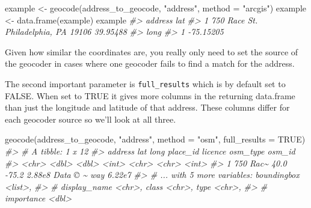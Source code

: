 \documentclass[
]{krantz}
\makeatletter
\newenvironment{Shaded}{\begin{snugshade}}{\end{snugshade}}
\newcommand{\AttributeTok}[1]{\textcolor[rgb]{0.61,0.61,0.61}{#1}}
\newcommand{\CommentTok}[1]{\textcolor[rgb]{0.37,0.37,0.37}{\textit{#1}}}
\newcommand{\ConstantTok}[1]{\textcolor[rgb]{0,0,0}{#1}}
\newcommand{\FunctionTok}[1]{\textcolor[rgb]{0,0,0}{#1}}
\newcommand{\NormalTok}[1]{#1}
\newcommand{\OtherTok}[1]{\textcolor[rgb]{0.37,0.37,0.37}{#1}}
\newcommand{\StringTok}[1]{\textcolor[rgb]{0.5,0.5,0.5}{#1}}
\newenvironment{kframe}{%
\medskip{}
\setlength{\fboxsep}{.8em}
 \def\at@end@of@kframe{}%
 \ifinner\ifhmode%
  \def\at@end@of@kframe{\end{minipage}}%
  \begin{minipage}{\columnwidth}%
 \fi\fi%
 \def\FrameCommand##1{\hskip\@totalleftmargin \hskip-\fboxsep
 \colorbox{shadecolor}{##1}\hskip-\fboxsep
     \hskip-\linewidth \hskip-\@totalleftmargin \hskip\columnwidth}%
 \MakeFramed {\advance\hsize-\width
   \@totalleftmargin\z@ \linewidth\hsize
   \@setminipage}}%
 {\par\unskip\endMakeFramed%
 \at@end@of@kframe}
\renewenvironment{Shaded}{\begin{kframe}}{\end{kframe}}
\makeatother
\begin{document}
\begin{Shaded}
\begin{Highlighting}[]
\NormalTok{example }\OtherTok{\textless{}{-}} \FunctionTok{geocode}\NormalTok{(address\_to\_geocode, }\StringTok{"address"}\NormalTok{, }\AttributeTok{method =} \StringTok{"arcgis"}\NormalTok{)}
\NormalTok{example }\OtherTok{\textless{}{-}} \FunctionTok{data.frame}\NormalTok{(example)}
\NormalTok{example}
\CommentTok{\#\textgreater{}                               address      lat}
\CommentTok{\#\textgreater{} 1 750 Race St. Philadelphia, PA 19106 39.95488}
\CommentTok{\#\textgreater{}        long}
\CommentTok{\#\textgreater{} 1 {-}75.15205}
\end{Highlighting}
\end{Shaded}

Given how similar the coordinates are, you really only need to set the source of the geocoder in cases where one geocoder fails to find a match for the address.

The second important parameter is \texttt{full\_results} which is by default set to FALSE. When set to TRUE it gives more columns in the returning data.frame than just the longitude and latitude of that address. These columns differ for each geocoder source so we'll look at all three.

\begin{Shaded}
\begin{Highlighting}[]
\FunctionTok{geocode}\NormalTok{(address\_to\_geocode, }\StringTok{"address"}\NormalTok{, }\AttributeTok{method =} \StringTok{"osm"}\NormalTok{, }\AttributeTok{full\_results =} \ConstantTok{TRUE}\NormalTok{)}
\CommentTok{\#\textgreater{} \# A tibble: 1 x 12}
\CommentTok{\#\textgreater{}   address    lat  long place\_id licence  osm\_type osm\_id}
\CommentTok{\#\textgreater{}   \textless{}chr\textgreater{}    \textless{}dbl\textgreater{} \textless{}dbl\textgreater{}    \textless{}int\textgreater{} \textless{}chr\textgreater{}    \textless{}chr\textgreater{}     \textless{}int\textgreater{}}
\CommentTok{\#\textgreater{} 1 750 Rac\textasciitilde{}  40.0 {-}75.2   2.88e8 Data © \textasciitilde{} way      6.22e7}
\CommentTok{\#\textgreater{} \# ... with 5 more variables: boundingbox \textless{}list\textgreater{},}
\CommentTok{\#\textgreater{} \#   display\_name \textless{}chr\textgreater{}, class \textless{}chr\textgreater{}, type \textless{}chr\textgreater{},}
\CommentTok{\#\textgreater{} \#   importance \textless{}dbl\textgreater{}}
\end{Highlighting}
\end{Shaded}
\end{document}
